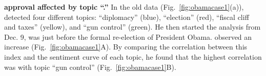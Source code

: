 \noindent \textbf{\normalsize {} approval  affected by  topic ``.'' }
In the old data (Fig.~\ref{fig:obamacase1}(a)),  detected four different topics: ``diplomacy'' (blue), ``election'' (red), ``fiscal cliff and taxes'' (yellow), and ``gun control'' (green).
He then started the analysis from Dec. 9,   was just before the formal re-election of President Obama.
 observed an increase   (Fig.~\ref{fig:obamacase1}A).
By comparing the correlation between this index and the sentiment curve of each topic, he found that the highest correlation was with  topic ``gun control'' (Fig.~\ref{fig:obamacase1}B).
